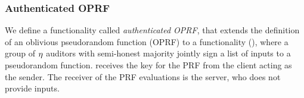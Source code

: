 \subsubsection{Authenticated OPRF}
%
We define a functionality called \emph{authenticated OPRF}, that extends the definition of an oblivious pseudorandom function (OPRF) to a functionality \authOPRFFunc (), where a group of $\eta$ auditors with semi-honest majority jointly sign a list of inputs to a pseudorandom function. \authOPRFFunc receives the key for the PRF from the client acting as the sender. The receiver of the PRF evaluations is the server, who does not provide inputs.
%



